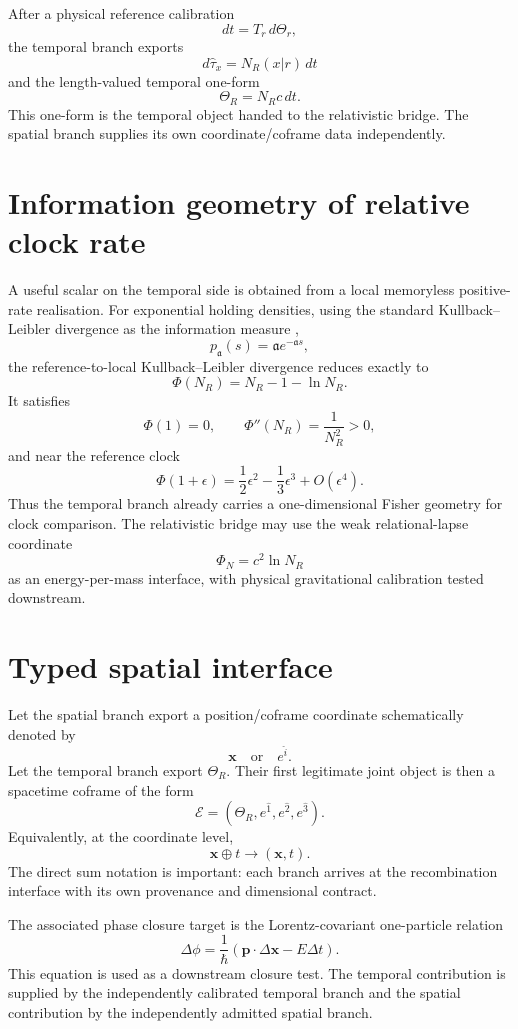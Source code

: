 After a physical reference calibration
\[
dt=T_r\,d\Theta_r,
\]
the temporal branch exports
\[
d\widehat\tau_x=N_R(x|r)\,dt
\]
and the length-valued temporal one-form
\[
\boxed{
\Theta_R=N_Rc\,dt.
}
\]
This one-form is the temporal object handed to the relativistic bridge. The spatial branch supplies its own coordinate/coframe data independently.

\section{Information geometry of relative clock rate}

A useful scalar on the temporal side is obtained from a local memoryless positive-rate realisation. For exponential holding densities, using the standard Kullback--Leibler divergence as the information measure \cite{KullbackLeibler1951},
\[
p_{\mathfrak a}(s)=\mathfrak a e^{-\mathfrak a s},
\]
the reference-to-local Kullback--Leibler divergence reduces exactly to
\[
\boxed{
\Phi(N_R)=N_R-1-\ln N_R.
}
\]
It satisfies
\[
\Phi(1)=0,
\qquad
\Phi''(N_R)=\frac{1}{N_R^2}>0,
\]
and near the reference clock
\[
\Phi(1+\epsilon)
=
\frac12\epsilon^2-\frac13\epsilon^3+O(\epsilon^4).
\]
Thus the temporal branch already carries a one-dimensional Fisher geometry for clock comparison. The relativistic bridge may use the weak relational-lapse coordinate
\[
\Phi_N=c^2\ln N_R
\]
as an energy-per-mass interface, with physical gravitational calibration tested downstream.

\section{Typed spatial interface}

Let the spatial branch export a position/coframe coordinate schematically denoted by
\[
\mathbf x
\quad\text{or}\quad
e^{\hat i}.
\]
Let the temporal branch export \(\Theta_R\). Their first legitimate joint object is then a spacetime coframe of the form
\[
\boxed{
\mathcal E
=
\left(\Theta_R,e^{\hat1},e^{\hat2},e^{\hat3}\right).
}
\]
Equivalently, at the coordinate level,
\[
\boxed{
\mathbf x\oplus t
\longrightarrow
(\mathbf x,t).
}
\]
The direct sum notation is important: each branch arrives at the recombination interface with its own provenance and dimensional contract.

The associated phase closure target is the Lorentz-covariant one-particle relation
\[
\boxed{
\Delta\phi
=
\frac{1}{\hbar}
\left(\mathbf p\cdot\Delta\mathbf x-E\Delta t\right).
}
\]
This equation is used as a downstream closure test. The temporal contribution is supplied by the independently calibrated temporal branch and the spatial contribution by the independently admitted spatial branch.

